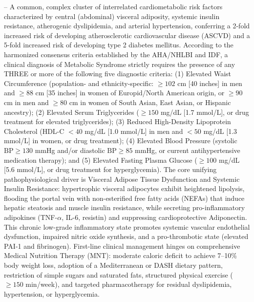 -- A common, complex cluster of interrelated cardiometabolic risk factors characterized by central (abdominal) visceral adiposity, systemic insulin resistance, atherogenic dyslipidemia, and arterial hypertension, conferring a 2-fold increased risk of developing atherosclerotic cardiovascular disease (ASCVD) and a 5-fold increased risk of developing type 2 diabetes mellitus. According to the harmonized consensus criteria established by the AHA/NHLBI and IDF, a clinical diagnosis of Metabolic Syndrome strictly requires the presence of any THREE or more of the following five diagnostic criteria: (1) Elevated Waist Circumference (population- and ethnicity-specific: $\ge 102$ cm [40 inches] in men and $\ge 88$ cm [35 inches] in women of Europid/North American origin, or $\ge 90$ cm in men and $\ge 80$ cm in women of South Asian, East Asian, or Hispanic ancestry); (2) Elevated Serum Triglycerides ($\ge 150$ mg/dL [1.7 mmol/L], or drug treatment for elevated triglycerides); (3) Reduced High-Density Lipoprotein Cholesterol (HDL-C $<40$ mg/dL [1.0 mmol/L] in men and $<50$ mg/dL [1.3 mmol/L] in women, or drug treatment); (4) Elevated Blood Pressure (systolic $\text{BP} \ge 130$ mmHg and/or diastolic $\text{BP} \ge 85$ mmHg, or current antihypertensive medication therapy); and (5) Elevated Fasting Plasma Glucose ($\ge 100$ mg/dL [5.6 mmol/L], or drug treatment for hyperglycemia). The core unifying pathophysiological driver is Visceral Adipose Tissue Dysfunction and Systemic Insulin Resistance: hypertrophic visceral adipocytes exhibit heightened lipolysis, flooding the portal vein with non-esterified free fatty acids (NEFAs) that induce hepatic steatosis and muscle insulin resistance, while secreting pro-inflammatory adipokines (TNF-$\alpha$, IL-6, resistin) and suppressing cardioprotective Adiponectin. This chronic low-grade inflammatory state promotes systemic vascular endothelial dysfunction, impaired nitric oxide synthesis, and a pro-thrombotic state (elevated PAI-1 and fibrinogen). First-line clinical management hinges on comprehensive Medical Nutrition Therapy (MNT): moderate caloric deficit to achieve 7--10\% body weight loss, adoption of a Mediterranean or DASH dietary pattern, restriction of simple sugars and saturated fats, structured physical exercise ($\ge 150$ min/week), and targeted pharmacotherapy for residual dyslipidemia, hypertension, or hyperglycemia.

